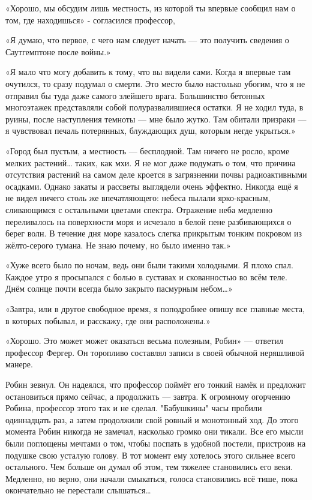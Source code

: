 \documentclass[a5paper, 9pt,
final, openany, twoside=true]{memoir}
\begin{document}
«Хорошо, мы обсудим лишь местность, из которой ты впервые сообщил нам о том, где находишься» - согласился профессор,

«Я думаю, что первое, с чего нам следует начать — это получить сведения о Саутгемптоне после войны.»

«Я мало что могу добавить к тому, что вы видели сами. Когда я впервые там очутился, то сразу подумал о смерти. Это место было настолько убогим, что я не отправил бы туда даже самого злейшего врага. Большинство бетонных многоэтажек представляли собой полуразвалившиеся остатки. Я не ходил туда, в руины, после наступления темноты — мне было жутко. Там обитали призраки — я чувствовал печаль потерянных, блуждающих душ, которым негде укрыться.»

«Город был пустым, а местность — бесплодной. Там ничего не росло, кроме мелких растений… таких, как мхи. Я не мог даже подумать о том, что причина отсутствия растений на самом деле кроется в загрязнении почвы радиоактивными осадками. Однако закаты и рассветы выглядели очень эффектно. Никогда ещё я не видел ничего столь же впечатляющего: небеса пылали ярко-красным, сливающимся с остальными цветами спектра. Отражение неба медленно переливалось на поверхности моря и исчезало в белой пене разбивающихся о берег волн. В течение дня море казалось слегка прикрытым тонким покровом из жёлто-серого тумана. Не знаю почему, но было именно так.»

«Хуже всего было по ночам, ведь они были такими холодными. Я плохо спал. Каждое утро я просыпался с болью в суставах и скованностью во всём теле. Днём солнце почти всегда было закрыто пасмурным небом…»

«Завтра, или в другое свободное время, я поподробнее опишу все главные места, в которых побывал, и расскажу, где они расположены.»

«Хорошо. Это может может оказаться весьма полезным, Робин» — ответил профессор Фергер. Он торопливо составлял записи в своей обычной неряшливой манере.

Робин зевнул. Он надеялся, что профессор поймёт его тонкий намёк и предложит остановиться прямо сейчас, а продолжить — завтра. К огромному огорчению Робина, профессор этого так и не сделал. "Бабушкины" часы пробили одиннадцать раз, а затем продолжили свой ровный и монотонный ход. До этого момента Робин никогда не замечал, насколько громко они тикали. Все его мысли были поглощены мечтами о том, чтобы поспать в удобной постели, пристроив на подушке свою усталую голову. В тот момент ему хотелось этого сильнее всего остального. Чем больше он думал об этом, тем тяжелее становились его веки. Медленно, но верно, они начали смыкаться, голоса становились всё тише, пока окончательно не перестали слышаться…
\end{document}
